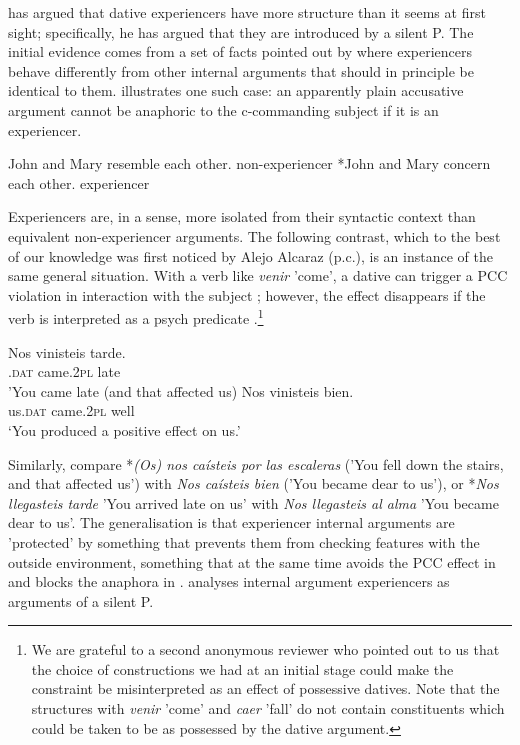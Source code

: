 \documentclass[output=paper,colorlinks,citecolor=brown,nonflat]{./langscibook}
\begin{document}
\citet{Landau2010} has argued that dative experiencers have more structure than it seems at first sight; specifically, he has argued that they are introduced by a silent P. The initial evidence comes from a set of facts pointed out by \citeauthor{Landau2010} where experiencers behave differently from other internal arguments that should in principle be identical to them.  illustrates one such case: an apparently plain accusative argument cannot be anaphoric to the c-commanding subject if it is an experiencer.  

\ea%
    \label{ex:fabregas:29}
    \ea\label{ex:fabregas:29a}
    John and Mary resemble each other. \hfill non-experiencer
    \ex\label{ex:fabregas:29b}
    *John and Mary concern each other. \hfill experiencer
    \z
\z

Experiencers are, in a sense, more isolated from their syntactic context than equivalent non-experiencer arguments. The following contrast, which to the best of our knowledge was first noticed by Alejo Alcaraz (p.c.), is an instance of the same general situation. With a verb like \textit{venir} 'come', a dative can trigger a PCC violation in interaction with the subject ; however, the effect disappears if the verb is interpreted as a psych predicate .\footnote{We are grateful to a second anonymous reviewer who pointed out to us that the choice of constructions we had at an initial stage could make the constraint be misinterpreted as an effect of possessive datives. Note that the structures with \textit{venir} 'come' and \textit{caer} 'fall' do not contain constituents which could be taken to be as possessed by the dative argument.}

\ea%
    \label{ex:fabregas:30}
    \ea\label{ex:fabregas:30a}
    \gll    *Nos     vinisteis   tarde.\\
            \textsc{.dat}   {came.2}\textsc{pl}   {late}\\
    \glt    'You came late (and that affected us)
    \ex\label{ex:fabregas:30b}
    \gll    Nos     vinisteis     bien.\\
            {us}\textsc{.dat}  {came.2}\textsc{pl}   {well}\\
    \glt `You produced a positive effect on us.'
    \z
\z

Similarly, compare *\textit{(Os) nos caísteis por las escaleras} ('You fell down the stairs, and that affected us') with \textit{Nos caísteis bien} ('You became dear to us'), or *\textit{Nos llegasteis tarde} 'You arrived late on us' with \textit{Nos llegasteis al alma} 'You became dear to us'. The generalisation is that experiencer internal arguments are 'protected' by something that prevents them from checking features with the outside environment, something that at the same time avoids the PCC effect in  and blocks the anaphora in . \citet{Landau2010} analyses internal argument experiencers as arguments of a silent P.
\end{document}
